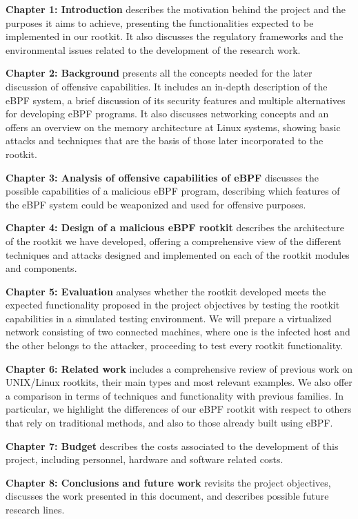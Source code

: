 \textbf{Chapter 1: Introduction} describes the motivation behind the project and the purposes it aims to achieve, presenting the functionalities expected to be implemented in our rootkit. It also discusses the regulatory frameworks and the environmental issues related to the development of the research work.

\textbf{Chapter 2: Background} presents all the concepts needed for the later discussion of offensive capabilities. It includes an in-depth description of the eBPF system, a brief discussion of its security features and multiple alternatives for developing eBPF programs. It also discusses networking concepts and an offers an overview on the memory architecture at Linux systems, showing basic attacks and techniques that are the basis of those later incorporated to the rootkit.

\textbf{Chapter 3: Analysis of offensive capabilities of eBPF} discusses the possible capabilities of a malicious eBPF program, describing which features of the eBPF system could be weaponized and used for offensive purposes.

\textbf{Chapter 4: Design of a malicious eBPF rootkit} describes the architecture of the rootkit we have developed, offering a comprehensive view of the different techniques and attacks designed and implemented on each of the rootkit modules and components.

\textbf{Chapter 5: Evaluation} analyses whether the rootkit developed meets the expected functionality proposed in the project objectives by testing the rootkit capabilities in a simulated testing environment. We will prepare a virtualized network consisting of two connected machines, where one is the infected host and the other belongs to the attacker, proceeding to test every rootkit functionality.

\textbf{Chapter 6: Related work} includes a comprehensive review of previous work on UNIX/Linux rootkits, their main types and most relevant examples. We also offer a comparison in terms of techniques and functionality with previous families. In particular, we highlight the differences of our eBPF rootkit with respect to others that rely on traditional methods, and also to those already built using eBPF.

\textbf{Chapter 7: Budget} describes the costs associated to the development of this project, including personnel, hardware and software related costs.

\textbf{Chapter 8: Conclusions and future work} revisits the project objectives, discusses the work presented in this document, and describes possible future research lines.

